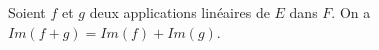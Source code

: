 Soient $f$ et $g$ deux applications linéaires de $E$ dans $F$. On a $Im(f+g)=Im(f)+Im(g)$.

\begin{reponses}
\end{reponses}

\begin{comment}
Prendre par exemple $g=-f$.
\end{comment}

